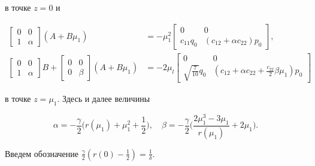 в точке $z=0$ и 


\begin{equation} 


\begin{split} 


\begin{bmatrix} 0 & 0 \\ 1 & \alpha \end{bmatrix} (A+B\mu_1)&= 


-\mu^2_1 \begin{bmatrix} 


0 & 0 \\ c_{11}q_0 & (c_{12}+\alpha c_{22})p_0 


\end{bmatrix} 


, \\ 


\begin{bmatrix} 0 & 0 \\ 1 & \alpha \end{bmatrix}B+ 


\begin{bmatrix} 0 & 0 \\ 0 & \beta \end{bmatrix} 


(A+B\mu_1)&=-2\mu_l \begin{bmatrix} 


0 & 0 \\ \sqrt{\frac{7}{10}}q_0 & (c_{12}+\alpha c_{22}+ 


\frac{c_{22}}{2}\beta\mu_1)p_0 


\end{bmatrix} 


\end{split} 


\end{equation} 


в точке $z=\mu_1$. Здесь и далее величины 


\begin{equation} 


\alpha=-\frac{\gamma}{2}\bigg(r(\mu_1)+\mu^2_1+\frac{1}{2}\bigg),\quad 


\beta=-\frac{\gamma}{2}\bigg( 


\frac{2\mu^3_1-3\mu_1}{r(\mu_1)}+2\mu_1\bigg). 


\end{equation} 


Введем обозначение $\frac{\gamma}{2}(r(0)-\frac{1}{2})=\frac{1}{\delta}$. 


